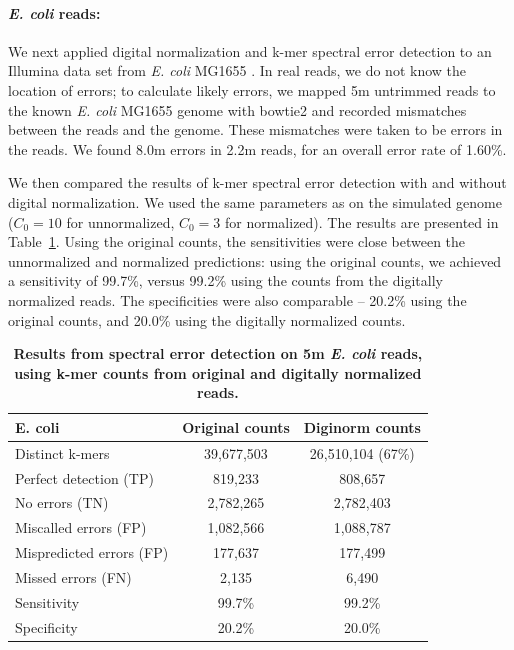 \documentclass{article}
\begin{document}

\paragraph{{\em E. coli} reads:}
We next applied digital normalization and k-mer spectral error
detection to an Illumina data set from {\em E. coli} MG1655
\cite{pubmed21926975}.  In real reads, we do not know the location of
errors; to calculate likely errors, we mapped 5m untrimmed reads to
the known {\em E. coli} MG1655 genome with bowtie2 \cite{bowtie2} and
recorded mismatches between the reads and the genome.  These
mismatches were taken to be errors in the reads.  We found 8.0m errors
in 2.2m reads, for an overall error rate of 1.60\%.

We then compared the results of k-mer spectral error detection with
and without digital normalization.  We used the same parameters as on
the simulated genome ($C_0=10$ for unnormalized, $C_0=3$ for
normalized).  The results are presented in
Table~\ref{tab:ecoli_dn_counts}. Using the original counts, the
sensitivities were close between the unnormalized and normalized
predictions: using the original counts, we achieved a sensitivity of
99.7\%, versus 99.2\% using the counts from the digitally normalized
reads.  The specificities were also comparable -- 20.2\% using the original
counts, and 20.0\% using the digitally normalized counts.



\begin{table}
\centering
\begin{tabular}{|l|c|c|}
\hline
{\bf E. coli} & Original counts & Diginorm counts \\
\hline
Distinct k-mers         & 39,677,503 & 26,510,104 (67\%) \\
\hline
Perfect detection (TP)  & 819,233   & 808,657 \\
No errors (TN)          & 2,782,265 & 2,782,403 \\
Miscalled errors (FP)   & 1,082,566 & 1,088,787 \\
Mispredicted errors (FP)& 177,637       & 177,499   \\
Missed errors (FN)      & 2,135     & 6,490    \\
\hline
Sensitivity & 99.7\% & 99.2\% \\
Specificity & 20.2\% & 20.0\% \\
\hline
\end{tabular}

\caption{{\bf Results from spectral error detection on 5m {\em
      E. coli} reads, using k-mer counts from original and digitally
    normalized reads.}}

\label{tab:ecoli_dn_counts}
\end{table}
\end{document}
